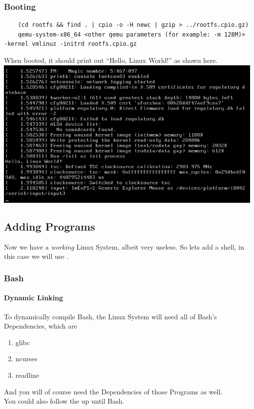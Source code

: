 \documentclass{article}
\begin{document}
			\subsubsection{Booting}
			\begin{lstlisting}
	(cd rootfs && find . | cpio -o -H newc | gzip > ../rootfs.cpio.gz)
	qemu-system-x86_64 <other qemu parameters (for example: -m 128M)> -kernel vmlinuz -initrd rootfs.cpio.gz
			\end{lstlisting}
			When booted, it should print out ``Hello, Linux World!'' as shown here.
			\\
			\includegraphics{HelloLinuxWorld.png}
		
		\subsection{Adding Programs}
		Now we have a \textit{working} Linux System, albeit very useless.
		So lets add a shell, in this case we will use .
		\subsubsection{Bash}
		\label{ScratchAddBash}
		\paragraph{Dynamic Linking}
		To dynamically compile Bash, the Linux System will need all of Bash's Dependencies, which are
		\begin{enumerate}
			\item glibc
			\item ncurses
			\item readline
		\end{enumerate}
		And you will of course need the Dependencies of those Programs as well.
		\\
		You could also follow the  up until Bash.
\end{document}
